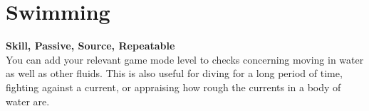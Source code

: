 \section{Swimming}\label{sec:swimming}
\textbf{Skill, Passive, Source, Repeatable}\\
You can add your relevant game mode level to checks concerning moving in water as well as other fluids.
This is also useful for diving for a long period of time, fighting against a current, or appraising how rough the currents in a body of water are.